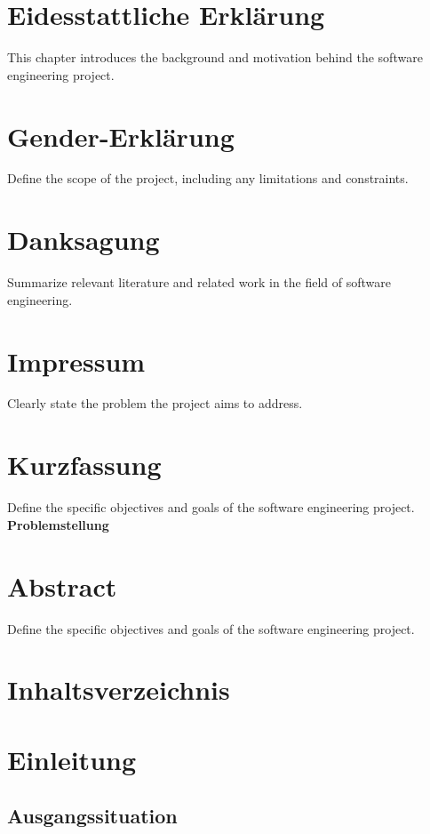 \documentclass[pdftex,11pt,a4paper]{book}
\begin{document}
\maketitle

\tableofcontents

\chapter*{Eidesstattliche Erklärung}
This chapter introduces the background and motivation behind the software engineering project.

\chapter*{Gender-Erklärung}
Define the scope of the project, including any limitations and constraints.

\chapter*{Danksagung}
Summarize relevant literature and related work in the field of software engineering.

\chapter*{Impressum}
Clearly state the problem the project aims to address.

\chapter*{Kurzfassung}
Define the specific objectives and goals of the software engineering project.
\textbf{Problemstellung} 

\chapter*{Abstract}
Define the specific objectives and goals of the software engineering project.

\chapter*{Inhaltsverzeichnis}

\chapter{Einleitung}
\section{Ausgangssituation}
\end{document}
